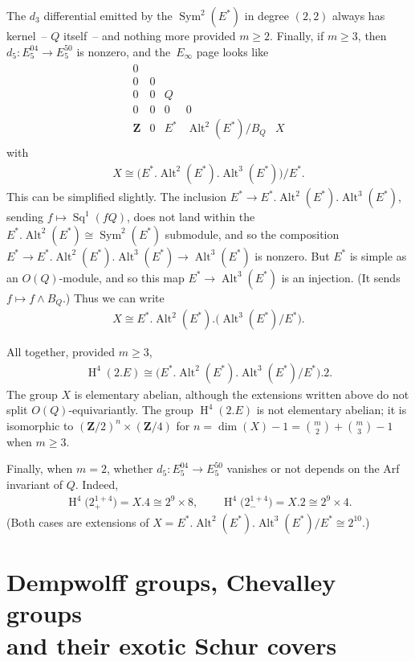 \documentclass[pdftex]{sigma}
\numberwithin{equation}{section}
\newcommand\bZ{\mathbf Z}
\DeclareMathOperator\homology{H}
\renewcommand\H{\homology}
\newcommand\<\langle
\renewcommand\>\rangle
\DeclareMathOperator\Sym{Sym}
\DeclareMathOperator\Alt{Alt}
\DeclareMathOperator\Sq{Sq}
\begin{document}
The $d_3$ differential emitted by the $\Sym^2(E^*)$ in degree $(2,2)$ always has kernel~-- $Q$ itself~-- and nothing more provided $m\geq 2$. Finally, if $m \geq 3$, then $d_5\colon E_5^{04} \to E_5^{50}$ is nonzero, and the~$E_\infty$ page looks like
\begin{gather*}
\begin{array}{ccccc}
0 \\
0 & 0 \\
0 & 0 & Q \\
0 & 0 & 0 & 0 \\
\bZ & 0 & E^* & \Alt^2(E^*)/B_Q & X
\end{array}
\end{gather*}
with
\begin{gather*} X \cong \big(E^*.\Alt^2(E^*).\Alt^3(E^*)\big)/E^*. \end{gather*}
This can be simplified slightly. The inclusion $E^* \to E^*.\Alt^2(E^*).\Alt^3(E^*)$, sending $f \mapsto \Sq^1(fQ)$, does not land within the $E^*.\Alt^2(E^*) \cong \Sym^2(E^*)$ submodule, and so the composition $E^* \to E^*.\Alt^2(E^*).\Alt^3(E^*) \to \Alt^3(E^*)$ is nonzero. But $E^*$ is simple as an $O(Q)$-module, and so this map $E^* \to \Alt^3(E^*)$ is an injection. (It sends $f \mapsto f\wedge B_Q$.) Thus we can write
\begin{gather*} X \cong E^* .\Alt^2(E^*).\big(\Alt^3(E^*)/E^*\big). \end{gather*}

All together, provided $m\geq 3$,
\begin{gather*} \H^4(2.E) \cong \big(E^*.\Alt^2(E^*).\Alt^3(E^*)/E^*\big).2. \end{gather*}
The group $X$ is elementary abelian, although the extensions written above do not split $O(Q)$-equivariantly. The group $\H^4(2.E)$ is not elementary abelian; it is isomorphic to $(\bZ/2)^n \times (\bZ/4)$ for $n = \dim(X)-1 = \binom m 2 + \binom m 3 - 1$ when $m\geq 3$.

Finally, when $m=2$, whether $d_5\colon E_5^{04} \to E_5^{50}$ vanishes or not depends on the Arf invariant of $Q$. Indeed,
\begin{gather*} \H^4\big(2^{1+4}_+\big) = X.4 \cong 2^9\times 8, \qquad \H^4\big(2^{1+4}_-\big) = X.2 \cong 2^9\times 4. \end{gather*}
(Both cases are extensions of $X = E^*.\Alt^2(E^*).\Alt^3(E^*)/E^* \cong 2^{10}$.)

\section[Dempwolff groups, Chevalley groups and their exotic Schur covers]{Dempwolff groups, Chevalley groups\\ and their exotic Schur covers} \label{sec:Dempwolff}
\end{document}
